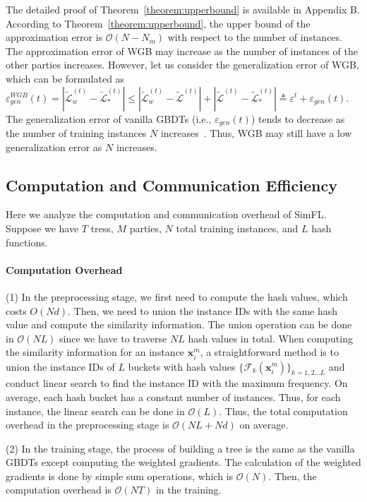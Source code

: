 \documentclass[letterpaper]{article} %
\theoremstyle{definition}
\newcommand{\mc}[1]{\mathcal{#1}}
\begin{document}
The detailed proof of Theorem~\ref{theorem:upperbound} is available in Appendix B. According to Theorem~\ref{theorem:upperbound}, the upper bound of the approximation error is $\mathcal{O}(N-N_m)$ with respect to the number of instances. The approximation error of WGB may increase as the number of instances of the other parties increases. However, let us consider the generalization error of WGB, which can be formulated as $\varepsilon_{gen}^{WGB}(t) = |\mathcal{\tilde{L}}_w^{(t)}-\mathcal{\tilde{L}}_*^{(t)}| \leq |\mathcal{\tilde{L}}_w^{(t)} - \mathcal{\tilde{L}}^{(t)}| + |\mathcal{\tilde{L}}^{(t)}-\mathcal{\tilde{L}}_*^{(t)}|\triangleq \varepsilon^t + \varepsilon_{gen}(t)$. The generalization error of vanilla GBDTs (i.e., $\varepsilon_{gen}(t)$) tends to decrease as the number of training instances $N$ increases~\cite{shalev2014understanding}. Thus, WGB may still have a low generalization error as $N$ increases. 


\subsection{Computation and Communication Efficiency}
Here we analyze the computation and communication overhead of SimFL. Suppose we have $T$ tress, $M$ parties, $N$ total training instances, and $L$ hash functions.

\paragraph{Computation Overhead} (1) In the preprocessing stage, we first need to compute the hash values, which costs $O(Nd)$. Then, we need to union the instance IDs with the same hash value and compute the similarity information. The union operation can be done in $\mathcal{O}(NL)$ since we have to traverse $NL$ hash values in total. When computing the similarity information for an instance $\mathbf{x}_i^m$, a straightforward method is to union the instance IDs of $L$ buckets with hash values $\{\mathcal{F}_k(\mathbf{x}_i^m)\}_{k=1,2...L}$ and conduct linear search to find the instance ID with the maximum frequency. On average, each hash bucket has a constant number of instances. Thus, for each instance, the linear search can be done in $\mc{O}(L)$. Thus, the total computation overhead in the preprocessing stage is $\mc{O}(NL+Nd)$ on average.

(2) In the training stage, the process of building a tree is the same as the vanilla GBDTs except computing the weighted gradients. The calculation of the weighted gradients is done by simple sum operations, which is $\mathcal{O}(N)$. Then, the computation overhead is $\mathcal{O}(NT)$ in the training.
\end{document}

